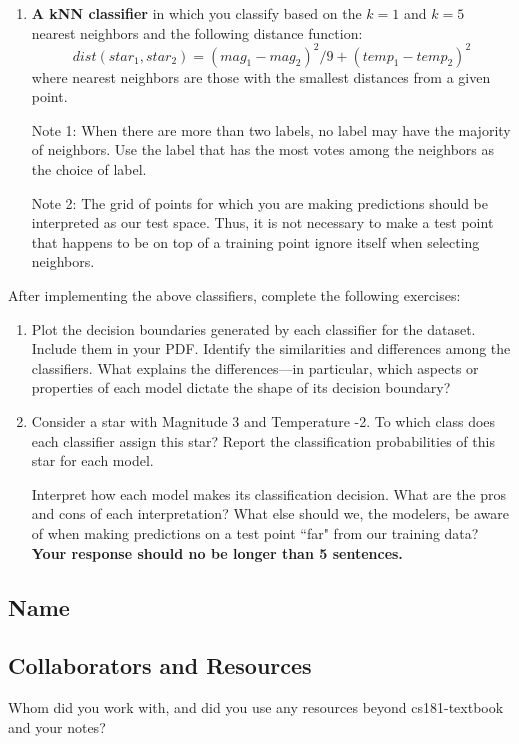 \documentclass[submit]{harvardml}
\begin{document}
\begin{problem}
\begin{enumerate}[label=\alph*)]
\item \textbf{A kNN classifier} in which you classify based on the $k = 1$ and $k = 5$ nearest neighbors and the following distance function: $$dist(star_1, star_2) = (mag_1 - mag_2)^2/9 + (temp_1 - temp_2)^2$$
where nearest neighbors are those with the smallest distances from a given point.

  Note 1: When there are more than two labels, no label may have the
  majority of neighbors.  Use the label that has the most votes among
  the neighbors as the choice of label. 

  Note 2: The grid of points for which you are making predictions
  should be interpreted as our test space.  Thus, it is not necessary
  to make a test point that happens to be on top of a training point
  ignore itself when selecting neighbors.

\end{enumerate}

After implementing the above classifiers, complete the following exercises:

\begin{enumerate}
    \item Plot the decision boundaries generated by each classifier for the dataset. Include them in your PDF. 
    Identify the similarities and differences among the classifiers. What explains the differences---in particular, which aspects or properties of each model dictate the shape of its decision boundary? 
    
    \item 
    
    Consider a star with Magnitude 3 and Temperature -2. To which class does each classifier assign this star? Report the classification probabilities of this star for each model. 
    
    Interpret how each model makes its classification decision. What are the pros and cons of each interpretation? What else should we, the modelers, be aware of when making predictions on a test point ``far" from our training data? \textbf{Your response should no be longer than 5 sentences.}
\end{enumerate}
\end{problem}


\newpage
\subsection*{Name}

\subsection*{Collaborators and Resources}
Whom did you work with, and did you use any resources beyond cs181-textbook and your notes?
\end{document}
